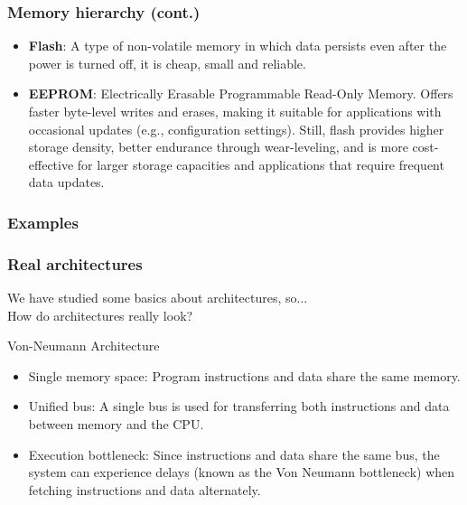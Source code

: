 \documentclass[aspectratio=169]{beamer}
\begin{document}
\begin{frame}
  \frametitle{Memory hierarchy (cont.)}
  \begin{itemize}
    \item <1-> \textbf{Flash}: A type of non-volatile memory in which data persists even after the power is turned off, it is cheap, small and reliable.
    \item <2-> \textbf{EEPROM}: Electrically Erasable Programmable Read-Only Memory. Offers faster byte-level writes and erases, making it suitable for applications with occasional updates (e.g., configuration settings). Still, flash provides higher storage density, better endurance through wear-leveling, and is more cost-effective for larger storage capacities and applications that require frequent data updates.
  \end{itemize}
\end{frame}

\subsubsection{Examples}
\begin{frame}
  \frametitle{Real architectures}
  We have studied some basics about architectures, so... \\ \pause
  How do architectures really look?
\end{frame}

\begin{frame}{Von-Neumann Architecture}
  \begin{itemize}
      \item <1-> Single memory space: Program instructions and data share the same memory.
      \item <2-> Unified bus: A single bus is used for transferring both instructions and data between memory and the CPU.
      \item <3-> Execution bottleneck: Since instructions and data share the same bus, the system can experience delays (known as the Von Neumann bottleneck) when fetching instructions and data alternately.
  \end{itemize}
\end{frame}
\end{document}
